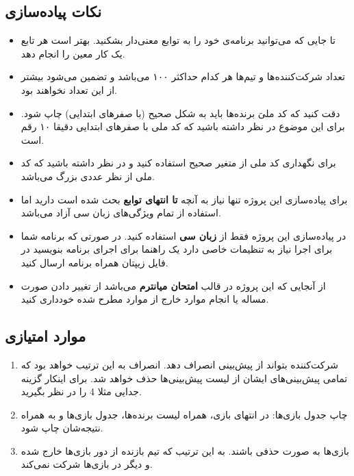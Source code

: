 \documentclass[../main.tex]{subfiles}
\begin{document}
\subsection{نکات پیاده‌سازی}

\begin{itemize}
    \item تا جایی که می‌توانید برنامه‌ی خود را به توابع معنی‌دار بشکنید. بهتر است هر تابع یک کار معین را انجام دهد.
    \item تعداد شرکت‌کننده‌ها و تیم‌ها هر کدام حداکثر ۱۰۰ می‌باشد و تضمین می‌شود بیشتر از این تعداد نخواهند بود.
    \item دقت کنید که کد ملیَ برنده‌ها باید به شکل صحیح (با صفرهای ابتدایی) چاپ شود. برای این موضوع در نظر داشته باشید که کد ملی با صفرهای ابتدایی دقیقا ۱۰ رقم است.
    \item برای نگهداری کد ملی از متغیر صحیح استفاده کنید و در نظر داشته باشید که کد ملی از نظر عددی بزرگ می‌باشد.
    \item برای پیاده‌سازی این پروژه تنها نیاز به آنچه \textbf{تا انتهای توابع} بحث شده است دارید اما استفاده از تمام ویژگی‌های زبان سی آزاد می‌باشد.
    \item در پیاده‌سازی این پروژه فقط از \textbf{زبان سی} استفاده کنید. در صورتی که برنامه شما برای اجرا نیاز به تنظیمات خاصی دارد یک راهنما برای اجرای برنامه بنویسید در فایل زیپتان همراه برنامه ارسال کنید.
    \item از آنجایی که این پروژه در قالب \textbf{امتحان میانترم} می‌باشد از تغییر دادن صورت مساله یا انجام موارد خارج از موارد مطرح شده خودداری کنید.
\end{itemize}

\subsection{موارد امتیازی}

\begin{enumerate}
    \item شرکت‌کننده بتواند از پیش‌بینی انصراف دهد. انصراف به این ترتیب خواهد بود که تمامی پیش‌بینی‌های ایشان از لیست پیش‌بینی‌ها حذف خواهد شد. برای اینکار گزینه جدایی مثلا 4 را در نظر بگیرید.
    \item چاپ جدول بازی‌ها: در انتهای بازی، همراه لیست برنده‌ها، جدول بازی‌ها و به همراه نتیجه‌شان چاپ شود.
    \item بازی‌ها به صورت حذفی باشند. به این ترتیب که تیم بازنده از دور بازی‌ها خارج شده و دیگر در بازی‌ها شرکت نمی‌کند.
\end{enumerate}
\end{document}
